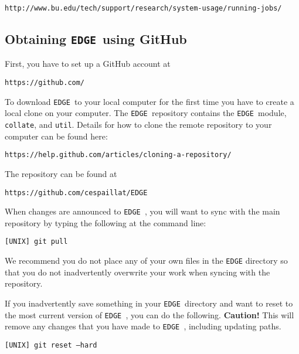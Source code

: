\documentclass{article}
\newcommand{\edge}{\texttt{EDGE }}
\begin{document}
\vspace{2mm}
\texttt{http://www.bu.edu/tech/support/research/system-usage/running-jobs/}
\vspace{2mm}

\subsection{Obtaining \edge using GitHub} \label{github}

\noindent First, you have to set up a GitHub account at 

\vspace{2mm}
\texttt{https://github.com/}
\vspace{2mm}

\noindent To download \edge to your local computer for the first time you have to create a local clone on your computer. The \edge repository contains the \edge module, \texttt{collate}, and \texttt{util}. Details for how to clone the remote repository to your computer can be found here:

\vspace{2mm}
\texttt{https://help.github.com/articles/cloning-a-repository/}
\vspace{2mm}

\noindent The repository can be found at

\vspace{2mm}
\texttt{https://github.com/cespaillat/EDGE}
\vspace{2mm}

\noindent When changes are announced to \edge, you will want to sync with the main repository by typing the following at the command line:

\vspace{2mm}
\texttt{[UNIX] git pull}
\vspace{2mm}

\noindent We recommend you do not place any of your own files in the \texttt{EDGE} directory so that you do not inadvertently overwrite your work when syncing with the repository.
\vspace{2mm}

\noindent If you inadvertently save something in your \edge directory and want to reset to the most current version of \edge, you can do the following. \textbf{Caution!} This will remove any changes that you have made to \edge, including updating paths.

\vspace{2mm}
\texttt{[UNIX] git reset --hard}
\end{document}
